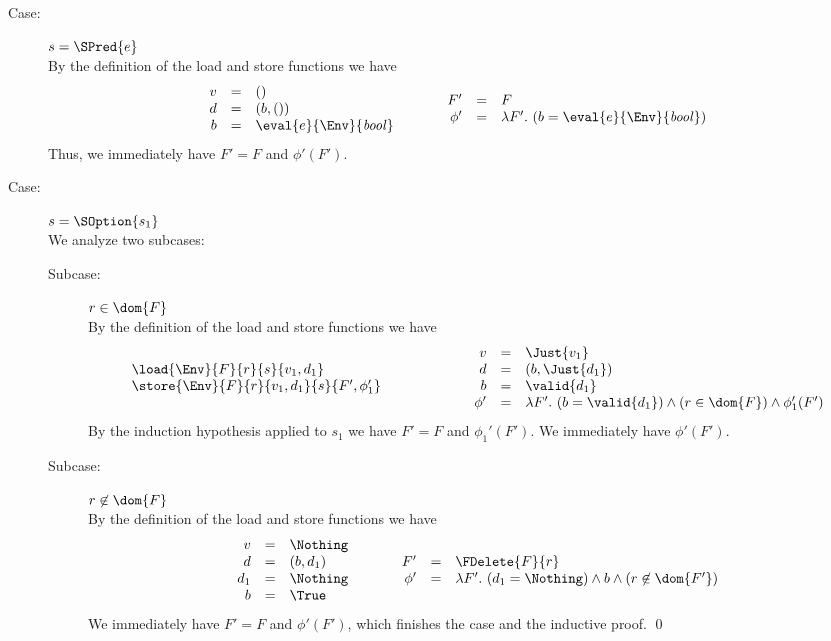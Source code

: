 {\begin{description}
\item[Case:] $s = \SPred{e}$\\[1ex]
%
By the definition of the load and store functions we have
\[
\begin{array}{rcl}
v &=& ()\\
d &=& (b,())\\
b &=& \eval{e}{\Env}{\mathit{bool}}\\
\end{array}\hspace*{1cm}\begin{array}{rcl}
F' &=& F\\
\phi' &=& \lambda F'.~(b = \eval{e}{\Env}{\mathit{bool}})\\
\end{array}
\]
Thus, we immediately have $F' = F$ and $\phi'(F')$.

\item[Case:] $s = \SOption{s_1}$\\[1ex]
%
We analyze two subcases:
\begin{description}
\item[Subcase:] $r \in \dom{F}$\\[1ex]
%
By the definition of the load and store functions we have
\[ 
\begin{array}{l}
\load{\Env}{F}{r}{s}{v_1,d_1}\\
\store{\Env}{F}{r}{v_1,d_1}{s}{ F',\phi_1' }\\
\end{array}\hspace*{2cm}\begin{array}{rcl}
v &=& \Just{v_1}\\
d &=& (b,\Just{d_1})\\
b &=& \valid{d_1}\\
\phi' &=& \lambda F'.~(b = \valid{d_1}) \wedge (r \in \dom{F}) \wedge \phi_1'(F')\\
\end{array}
\]
%
By the induction hypothesis applied to $s_1$ we have $F' = F$ and
$\phi_1'(F')$. We immediately have $\phi'(F')$.

\item[Subcase:] $r \not\in \dom{F}$\\[1ex]
%
By the definition of the load and store functions we have 
\[ 
\begin{array}{rcl}
v &=& \Nothing\\
d &=& (b,d_1)\\
d_1 &=& \Nothing\\
b &=& \True\\
\end{array}\hspace*{1cm}\begin{array}{rcl}
F' &=& \FDelete{F}{r}\\
\phi' &=& \lambda F'.~(d_1 = \Nothing) \wedge b \wedge  (r \not\in \dom{F'})
\end{array}
\]
We immediately have $F' = F$ and $\phi'(F')$, which finishes the case
and the inductive proof. \hfill \qed
\end{description}
\end{description}
}

